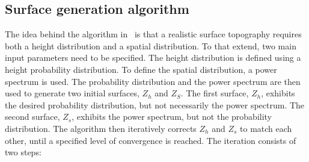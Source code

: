 \subsection{Surface generation algorithm}\label{subsec: Surface generation algorithm}
The idea behind the algorithm in~\cite{perez-rafolsGeneratingRandomlyRough2019} is that a realistic surface topography requires both a height distribution and a spatial distribution.
To that extend, two main input parameters need to be specified.
The height distribution is defined using a height probability distribution.
To define the spatial distribution, a power spectrum is used.
The probability distribution and the power spectrum are then used to generate two initial surfaces, $Z_h$ and $Z_S$. 
The first surface, $Z_h$, exhibits the desired probability distribution, but not necessarily the power spectrum.
The second surface, $Z_s$, exhibits the power spectrum, but not the probability distribution.
The algorithm then iteratively corrects $Z_h$ and $Z_s$ to match each other, until a specified level of convergence is reached.
The iteration consists of two steps:

